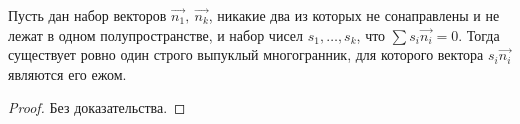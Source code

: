 \begin{theorem}[Минковский]
    Пусть дан набор векторов $\overrightarrow{n_1}, \ \overrightarrow{n_k}$, никакие два из которых не сонаправлены и не лежат в одном полупространстве, и набор чисел $s_1, \dots, s_k$, что $\sum s_i \overrightarrow{n_i} = 0$. Тогда существует ровно один строго выпуклый многогранник, для которого вектора $s_i \overrightarrow{n_i}$ являются его ежом.
\end{theorem}
\begin{proof}
    Без доказательства.
\end{proof}